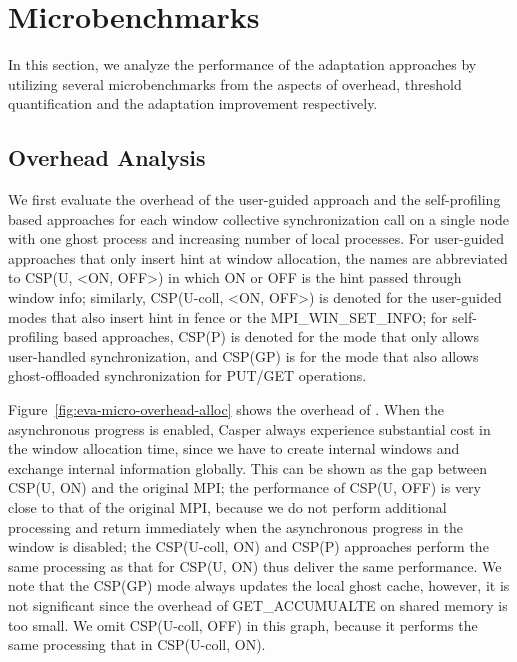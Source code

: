 \section{Microbenchmarks}\label{sec:eva-micro}

In this section, we analyze the performance of the adaptation approaches
by utilizing several microbenchmarks from the aspects of overhead,
threshold quantification and the adaptation improvement respectively.

\subsection{Overhead Analysis}
We first evaluate the overhead of the user-guided approach and the
self-profiling based approaches for each window collective synchronization
call on a single node with one ghost process and increasing number of local
processes. For user-guided approaches that only insert hint at window
allocation, the names are abbreviated to CSP(U, <ON, OFF>) in which ON or
OFF is the hint passed through window info; similarly, CSP(U-coll, <ON, OFF>)
is denoted for the user-guided modes that also insert hint in fence or the
MPI\_WIN\_SET\_INFO; for self-profiling based approaches, CSP(P) is denoted
for the mode that only allows user-handled synchronization, and CSP(GP)
is for the mode that also allows ghost-offloaded synchronization for
PUT/GET operations.

Figure~\ref{fig:eva-micro-overhead-alloc} shows the overhead of
. When the asynchronous progress is enabled,
Casper always experience substantial cost in the window allocation time,
since we have to create internal windows and exchange internal information
globally. This can be shown as the gap between CSP(U, ON) and the original
MPI; the performance of CSP(U, OFF) is very close to that of the original
MPI, because we do not perform additional processing and return immediately
when the asynchronous progress in the window is disabled; the
CSP(U-coll, ON) and CSP(P) approaches perform the same processing as that
for CSP(U, ON) thus deliver the same performance. We note that the CSP(GP)
mode always updates the local ghost cache, however, it is not significant
since the overhead of GET\_ACCUMUALTE on shared memory is too small.
We omit CSP(U-coll, OFF) in this graph, because it performs the same processing that in CSP(U-coll, ON).


